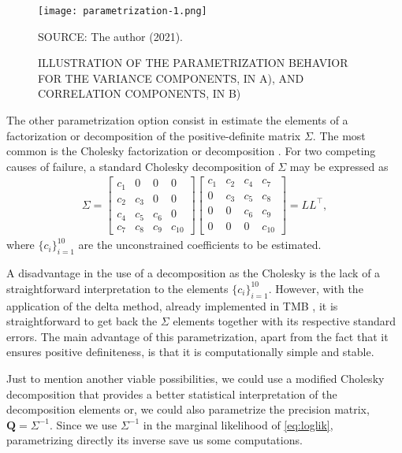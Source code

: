 \begin{figure}[H]
 \setlength{\abovecaptionskip}{.0001pt}
 \caption{ILLUSTRATION OF THE PARAMETRIZATION BEHAVIOR FOR THE VARIANCE
          COMPONENTS, IN A), AND CORRELATION COMPONENTS, IN B)}
 \vspace{0.2cm}\centering
 \texttt{[image: parametrization-1.png]}\\
 \begin{footnotesize}
  SOURCE: The author (2021).
 \end{footnotesize}
 \label{fig:parametrization}
\end{figure}

The other parametrization option consist in estimate the elements of a
factorization or decomposition of the positive-definite matrix
\(\Sigma\). The most common is the Cholesky factorization or
decomposition \cite{cholesky}. For two competing causes of failure, a
standard Cholesky decomposition of \(\Sigma\) may be expressed as
\begin{align*}
 \Sigma = \begin{bmatrix}
           c_{1}&0&0&0\\
           c_{2}&c_{3}&0&0\\
           c_{4}&c_{5}&c_{6}&0\\
           c_{7}&c_{8}&c_{9}&c_{10}
         \end{bmatrix}\begin{bmatrix}
                       c_{1}&c_{2}&c_{4}&c_{7}\\
                       0&c_{3}&c_{5}&c_{8}\\
                       0&0&c_{6}&c_{9}\\
                       0&0&0&c_{10}
                      \end{bmatrix} = LL^{\top},
\end{align*}
where \(\{c_{i}\}_{i=1}^{10}\) are the unconstrained coefficients to be
estimated.

A disadvantage in the use of a decomposition as the Cholesky is the lack
of a straightforward interpretation to the elements
\(\{c_{i}\}_{i=1}^{10}\). However, with the application of the delta
method, already implemented in TMB \cite{TMB}, it is straightforward to
get back the \(\Sigma\) elements together with its respective standard
errors. The main advantage of this parametrization, apart from the fact
that it ensures positive definiteness, is that it is computationally
simple and stable.

Just to mention another viable possibilities, we could use a modified
Cholesky decomposition \cite{modifiedcholesky} that provides a better
statistical interpretation of the decomposition elements or, we could
also parametrize the precision matrix, \(\bm{Q} = \Sigma^{-1}\). Since
we use \(\Sigma^{-1}\) in the marginal likelihood of
\autoref{eq:loglik}, parametrizing directly its inverse save us some
computations.

